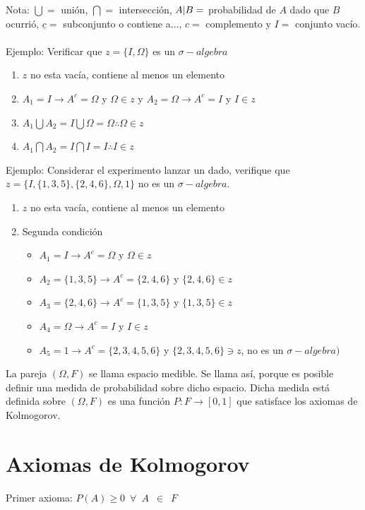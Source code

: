 \documentclass[11pt,fleqn]{book} %
\numberwithin{equation}{section} %
\numberwithin{figure}{section} %
\numberwithin{table}{section} %
\begin{document}
Nota:
$\bigcup =$ unión, $\bigcap =$ intersección, $A\arrowvert B =$ probabilidad de $A$ dado que $B$ ocurrió, $\underline{c} =$ subconjunto o contiene a..., $c =$ complemento y $I = $ conjunto vacío.
\ \\%
Ejemplo: Verificar que $z = \{ I, \Omega \}$ es un $\sigma-algebra$
\begin{enumerate}
    \item $z$ no esta vacía, contiene al menos un elemento
    \item $A_{1} = I \rightarrow A^{c} = \Omega$ y  $\Omega \in z$ y 
    $A_{2} = \Omega \rightarrow A^{c} = I$ y  $I \in z$
    \item $A_{1} \bigcup A_{2} = I \bigcup \Omega = \Omega \therefore \Omega \in z$
    \item $A_{1} \bigcap A_{2} = I \bigcap I = I \therefore I \in z$
\end{enumerate}
Ejemplo: Considerar el experimento lanzar un dado, verifique que $z = \{  I, \{1,3,5\},\{2,4,6\},\Omega,1 \}$ no es un $\sigma-algebra$.
\begin{enumerate}
    \item $z$ no esta vacía, contiene al menos un elemento
    \item Segunda condición
    \begin{itemize}
        \item $A_{1} = I \rightarrow A^{c} = \Omega$ y  $\Omega \in z$
        \item $A_{2} = \{1,3,5\} \rightarrow A^{c} = \{2,4,6\}$ y  $\{2,4,6\} \in z$
        \item $A_{3} = \{2,4,6\} \rightarrow A^{c} = \{1,3,5\}$ y  $\{1,3,5\} \in z$
        \item $A_{4} = \Omega \rightarrow A^{c} = I$ y  $I \in z$
        \item $A_{5} = 1 \rightarrow A^{c} = \{2,3,4,5,6\}$ y  $\{2,3,4,5,6\} \ni z$, no es un $\sigma-algebra)$
    \end{itemize}
\end{enumerate}
La pareja $(\Omega, F)$ se llama espacio medible. Se llama así, porque es posible definir una medida de probabilidad sobre dicho espacio. Dicha medida está definida sobre $(\Omega, F)$ es una función $P:F \to [0,1] $ que satisface los axiomas de Kolmogorov.
\newpage
\section{Axiomas de Kolmogorov}
Primer axioma: $P(A) \geq   0  \enspace \forall \enspace A \enspace \in \enspace F$
\end{document}

